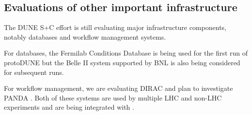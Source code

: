


\subsection{Evaluations of other important infrastructure}

The DUNE S+C effort is still evaluating major infrastructure components, notably databases and workflow management systems.

For databases\cite{Laycock:2019ynk}, the Fermilab Conditions Database is being used for the first run of protoDUNE but the Belle II\cite{Ritter:2018jxh} system supported by BNL is also being considered for subsequent runs. 

For workflow management, we are evaluating DIRAC \cite{Falabella:2016waj} and plan to investigate PANDA \cite{Megino:2017ywl}. Both of these systems are used by multiple LHC and non-LHC experiments and are being integrated with . 








